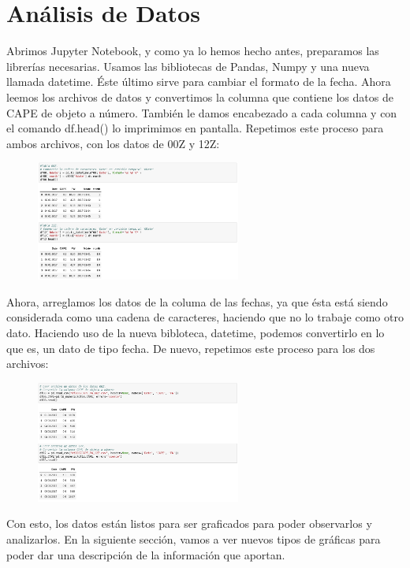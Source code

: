 \documentclass[a4paper]{article}
\begin{document}
\section{Análisis de Datos}

Abrimos Jupyter Notebook, y como ya lo hemos hecho antes, preparamos las librerías necesarias. Usamos las bibliotecas de Pandas, Numpy y una nueva llamada datetime. Éste último sirve para cambiar el formato de la fecha. Ahora leemos los archivos de datos y convertimos la columna que contiene los datos de CAPE de objeto a número. También le damos encabezado a cada columna y con el comando df.head() lo imprimimos en pantalla. Repetimos este proceso para ambos archivos, con los datos de 00Z y 12Z:

\begin{figure}[ht!]
 \centering
  \includegraphics[width=0.6\textwidth]{DF1.png}
\end{figure}

Ahora, arreglamos los datos de la columa de las fechas, ya que ésta está siendo considerada como una cadena de caracteres, haciendo que no lo trabaje como otro dato. Haciendo uso de la nueva bibloteca, datetime, podemos convertirlo en lo que es, un dato de tipo fecha. De nuevo, repetimos este proceso para los dos archivos:

\begin{figure}[ht!]
 \centering
  \includegraphics[width=0.6\textwidth]{DF2.png}
\end{figure}

Con esto, los datos están listos para ser graficados para poder observarlos y analizarlos. En la siguiente sección, vamos a ver nuevos tipos de gráficas para poder dar una descripción de la información que aportan.  
\end{document}
